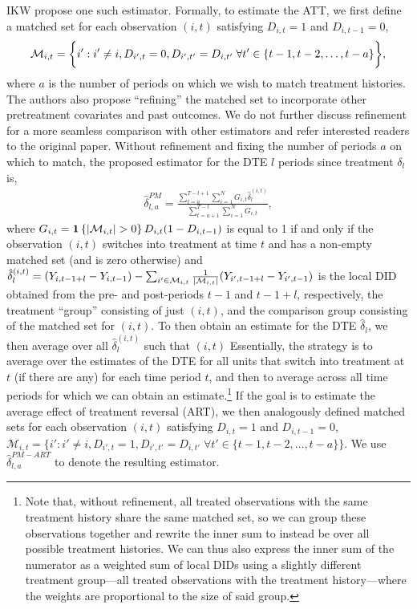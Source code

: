 \documentclass[12pt]{article}
\begin{document}
IKW \citeyearpar{IKW2021} propose one such estimator. 
Formally, to estimate the ATT, we first define a matched set for each observation $(i,t)$ satisfying $D_{i,t} = 1$ and $D_{i,t-1}=0$,
\vspace{-1em}\begin{align*}
    \mathcal{M}_{i,t} = \bigg\{ i' : i'\neq i, D_{i',t}=0, D_{i',t'}=D_{i,t'} \; \forall t' \in\{t-1, t-2, \dots, t-a\} \bigg\},\vspace{-1em}
\end{align*}
where $a$ is the number of periods on which we wish to match treatment histories. 
The authors also propose ``refining'' the matched set to incorporate other pretreatment covariates and past outcomes. We do not further discuss refinement for a more seamless comparison with other estimators and refer interested readers to the original paper. Without refinement and fixing the number of periods $a$ on which to match, the proposed estimator for the DTE $l$ periods since treatment $\delta_l$ is,
\begin{align*}
    \hat\delta^{PM}_{l,a}=
        \frac{\sum_{t=a}^{T-l+1}\sum_{i=1}^{N} G_{i,t}
        \hat\delta_l^{(i,t)} }
        {\sum_{t=a+1}^{T-l}\sum_{i=1}^{N} G_{i,t}},
\end{align*}
where $G_{i,t}=\indic{|\mc M_{i,t}|>0}D_{i,t} (1-D_{i,t-1})$ is equal to 1 if and only if the observation $(i,t)$ switches into treatment at time $t$ and has a non-empty matched set (and is zero otherwise) and $\hat\delta_l^{(i,t)}=(Y_{i, t-1+l} - Y_{i, t-1}) - \sum_{i' \in \mathcal{M}_{i,t}} \frac{1}{|\mathcal{M}_{i,t}|} (Y_{i', t-1+l}-Y_{i',t-1} )$ is the local DID obtained from the pre- and post-periods $t-1$ and $t-1+l$, respectively, the treatment ``group'' consisting of just $(i,t)$, and the comparison group consisting of the matched set for $(i,t)$. To then obtain an estimate for the DTE $\hat\delta_l$, we then average over all $\hat\delta_l^{(i,t)}$ such that $(i,t)$ Essentially, the strategy is to average over the estimates of the DTE for all units that switch into treatment at $t$ (if there are any) for each time period $t$, and then to average across all time periods for which we can obtain an estimate.\footnote{Note that, without refinement, all treated observations with the same treatment history share the same matched set, so we can group these observations together and rewrite the inner sum to instead be over all possible treatment histories. We can thus also express the inner sum of the numerator as a weighted sum of local DIDs using a slightly different treatment group---all treated observations with the treatment history---where the weights are proportional to the size of said group.} 
If the goal is to estimate the average effect of treatment reversal (ART), we then analogously defined matched sets for each observation $(i,t)$ satisfying $D_{i,t} = 1$ and $D_{i,t-1}=0$,
    $\mathcal{M}_{i,t} = \{ i' : i'\neq i, D_{i',t}=1, D_{i',t'}=D_{i,t'} \; \forall t' \in\{t-1, t-2, \dots, t-a\}\}$. We use $\hat\delta^{PM-ART}_{l,a}$ to denote the resulting estimator.
\end{document}
